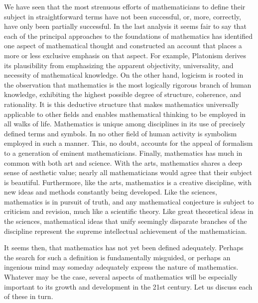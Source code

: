      We have seen that the most strenuous efforts of mathematicians to define their subject in straightforward terms have not been successful, or, more, correctly, have only been partially successful.  In the last analysis it seems fair to say that each of the principal approaches to the foundations of mathematics has identified one aspect of mathematical thought and constructed an account that places a more or less exclusive emphasis on that aspect.  For example, Platonism derives its plausibility from emphasizing the apparent objectivity, universality, and necessity of mathematical knowledge.  On the other hand, logicism is rooted in the observation that mathematics is the most logically rigorous branch of human knowledge, exhibiting the highest possible degree of structure, coherence, and rationality.  It is this deductive structure that makes mathematics universally applicable to other fields and enables mathematical thinking to be employed in all walks of life.  Mathematics is unique among disciplines in its use of precisely defined terms and symbols.  In no other field of human activity is symbolism employed in such a manner. This, no doubt, accounts for the appeal of formalism to a generation of eminent mathematicians.  Finally, mathematics has much in common with both art and science.  With the arts, mathematics shares a deep sense of aesthetic value; nearly all mathematicians would agree that their subject is beautiful.  Furthermore, like the arts, mathematics is a creative discipline, with new ideas and methods constantly being developed.  Like the sciences, mathematics is in pursuit of truth, and any mathematical conjecture is subject to criticism and revision, much like  a scientific theory.  Like great theoretical ideas in the sciences, mathematical ideas that unify seemingly disparate branches of the discipline represent the supreme intellectual achievement of the mathematician.
     
It seems then, that mathematics has not yet been defined adequately.  Perhaps the search for such a definition is fundamentally misguided, or perhaps an ingenious mind may someday adequately express the nature of mathematics.  Whatever may be the case,  several aspects of mathematics will be  especially important to its growth and development in the 21st century.  Let us discuss each of these in turn.
     
